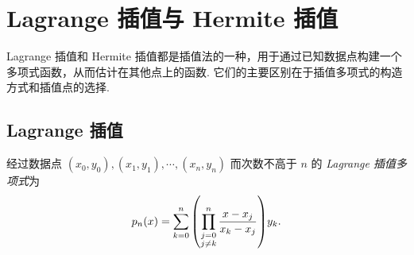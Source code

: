 \section{Lagrange 插值与 Hermite 插值}

Lagrange 插值和 Hermite 插值都是插值法的一种，用于通过已知数据点构建一个多项式函数，从而估计在其他点上的函数. 它们的主要区别在于插值多项式的构造方式和插值点的选择.

\subsection{Lagrange 插值}

\begin{definition}
    经过数据点 $(x_0,y_0),(x_1,y_1),\cdots,(x_n,y_n)$ 而次数不高于 $n$ 的 \textit{Lagrange 插值多项式}为 $$p_n(x)=\sum_{k=0}^{n}\qty(\prod_{\substack{j=0\\j\neq k}}^{n}\dfrac{x-x_j}{x_k-x_j})y_k.$$
\end{definition}


